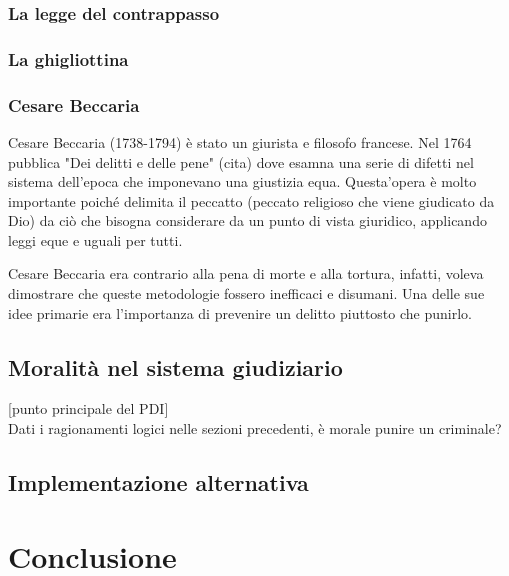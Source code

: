 \documentclass{article}
\begin{document}
\subsubsection{La legge del contrappasso}
\subsubsection{La ghigliottina}
\subsubsection{Cesare Beccaria}

Cesare Beccaria (1738-1794) è stato un giurista e filosofo francese.
Nel 1764 pubblica "Dei delitti e delle pene" (cita) 
dove esamna una serie di difetti nel sistema dell'epoca che imponevano una giustizia equa.
Questa'opera è molto importante poiché delimita il peccatto (peccato religioso
che viene giudicato da Dio) da ciò che bisogna considerare da un punto di vista giuridico,
applicando leggi eque e uguali per tutti.

Cesare Beccaria era contrario alla pena di morte e alla tortura, infatti,
voleva dimostrare che queste metodologie fossero inefficaci e disumani.
Una delle sue idee primarie era l'importanza di prevenire un delitto piuttosto che punirlo.

\subsection{Moralità nel sistema giudiziario}

[punto principale del PDI] \\
Dati i ragionamenti logici nelle sezioni precedenti, è morale punire
un criminale?

\subsection{Implementazione alternativa}

\section{Conclusione}

\pagebreak

\listoffigures

\pagebreak


\end{document}
